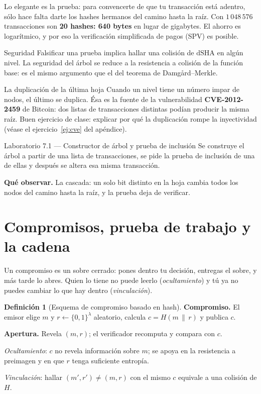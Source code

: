 \documentclass[11pt,a4paper]{article}
\theoremstyle{definition}
\newtheorem{definicion}{Definición}
\theoremstyle{plain}
\theoremstyle{remark}
\newcommand{\bits}{\{0,1\}}
\newcommand{\dsha}{\mathrm{dSHA}}
\newcommand{\concat}{\,\|\,}
\begin{document}
Lo elegante es la prueba: para convencerte de que tu transacción está adentro,
sólo hace falta darte los hashes hermanos del camino hasta la raíz. Con
$1\,048\,576$ transacciones son \textbf{20 hashes: 640 bytes} en lugar de
gigabytes. El ahorro es logarítmico, y por eso la verificación simplificada de
pagos (SPV) es posible.

\begin{nota}{Seguridad}
Falsificar una prueba implica hallar una colisión de $\dsha$ en algún nivel. La
seguridad del árbol se reduce a la resistencia a colisión de la función base: es
el mismo argumento que el del teorema de Damgård--Merkle.
\end{nota}

\begin{aviso}{La duplicación de la última hoja}
Cuando un nivel tiene un número impar de nodos, el último se duplica. Ésa es la
fuente de la vulnerabilidad \textbf{CVE-2012-2459} de Bitcoin: dos listas de
transacciones distintas podían producir la misma raíz. Buen ejercicio de clase:
explicar por qué la duplicación rompe la inyectividad
(véase el ejercicio~\ref{ej:cve} del apéndice).
\end{aviso}

\begin{laboratorio}{Laboratorio 7.1 — Constructor de árbol y prueba de inclusión}
Se construye el árbol a partir de una lista de transacciones, se pide la prueba
de inclusión de una de ellas y después se altera esa misma transacción.

\textbf{Qué observar.} La cascada: un solo bit distinto en la hoja cambia todos
los nodos del camino hasta la raíz, y la prueba deja de verificar.
\end{laboratorio}

\section{Compromisos, prueba de trabajo y la cadena}

Un compromiso es un sobre cerrado: pones dentro tu decisión, entregas el sobre, y
más tarde lo abres. Quien lo tiene no puede leerlo (\emph{ocultamiento}) y tú ya
no puedes cambiar lo que hay dentro (\emph{vinculación}).

\begin{definicion}[Esquema de compromiso basado en hash]
\textbf{Compromiso.} El emisor elige $m$ y $r \leftarrow \bits^{\lambda}$
aleatorio, calcula $c = H(m \concat r)$ y publica $c$.

\textbf{Apertura.} Revela $(m, r)$; el verificador recomputa y compara con $c$.

\smallskip
\emph{Ocultamiento}: $c$ no revela información sobre $m$; se apoya en la
resistencia a preimagen y en que $r$ tenga suficiente entropía.

\emph{Vinculación}: hallar $(m', r') \neq (m, r)$ con el mismo $c$ equivale a una
colisión de $H$.
\end{definicion}
\end{document}
